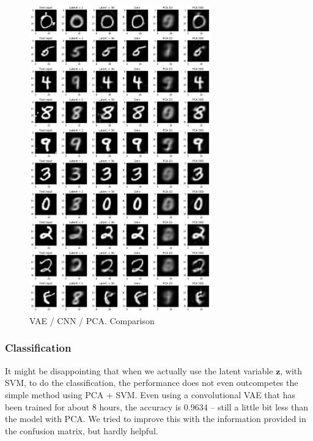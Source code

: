 \documentclass[a4paper,10pt,UTF8]{article}
\renewcommand*{\vec}[1]{\boldsymbol{#1}}
\numberwithin{equation}{section}
\numberwithin{figure}{section}
\begin{document}
\begin{figure}[htbp]
\centering
\includegraphics[width=0.7\textwidth]{img/reconstr_compare_pca.png}
\caption{VAE / CNN / PCA. Comparison}
\label{fig:reconstr_compare}
\end{figure}

\subsubsection{Classification}

It might be disappointing that when we actually use the latent variable $\vec{z}$, with SVM, to do the classification, the performance does not even outcompetes the simple method using PCA + SVM. Even using a convolutional VAE that has been trained for about 8 hours, the accuracy is 0.9634 -- still a little bit less than the model with PCA. We tried to improve this with the information provided in the confusion matrix, but hardly helpful.
\end{document}
